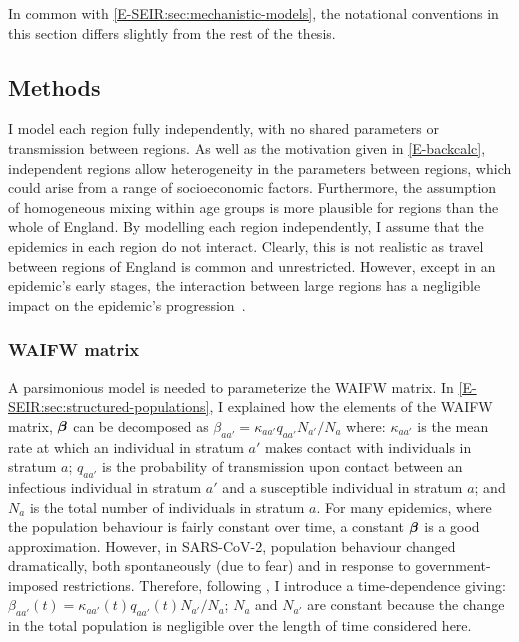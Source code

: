 \documentclass[thesis.tex]{subfiles}
\begin{document}
In common with \cref{E-SEIR:sec:mechanistic-models}, the notational conventions in this section differs slightly from the rest of the thesis.

\subsection{Methods} \label{SEIR:sec:methods-application}


I model each region fully independently, \ie with no shared parameters or transmission between regions.
As well as the motivation given in \cref{E-backcalc}, independent regions allow heterogeneity in the parameters between regions, which could arise from a range of socioeconomic factors.
Furthermore, the assumption of homogeneous mixing within age groups is more plausible for regions than the whole of England.
By modelling each region independently, I assume that the epidemics in each region do not interact.
Clearly, this is not realistic as travel between regions of England is common and unrestricted.
However, except in an epidemic's early stages, the interaction between large regions has a negligible impact on the epidemic's progression~\autocite[e.g.][]{birrellRealtimea,gogSpatial,eggoSpatial}.

\subsubsection{WAIFW matrix} \label{SEIR:sec:WAIFW-application}

A parsimonious model is needed to parameterize the WAIFW matrix.
In \cref{E-SEIR:sec:structured-populations}, I explained how the elements of the WAIFW matrix, $\bm{\beta}$ can be decomposed as $\beta_{aa'} = \kappa_{aa'} q_{aa'} N_{a'} / N_{a}$ where: $\kappa_{aa'}$ is the mean rate at which an individual in stratum $a'$ makes contact with individuals in stratum $a$; $q_{aa'}$ is the probability of transmission upon contact between an infectious individual in stratum $a'$ and a susceptible individual in stratum $a$; and $N_{a}$ is the total number of individuals in stratum $a$.
For many epidemics, where the population behaviour is fairly constant over time, a constant $\bm{\beta}$ is a good approximation.
However, in SARS-CoV-2, population behaviour changed dramatically, both spontaneously (\eg due to fear) and in response to government-imposed restrictions.
Therefore, following \textcite{birrellRealtime}, I introduce a time-dependence giving: $\beta_{aa'}(t) = \kappa_{aa'}(t) q_{aa'}(t) N_{a'} / N_a$; $N_a$ and $N_{a'}$ are constant because the change in the total population is negligible over the length of time considered here.
\end{document}
